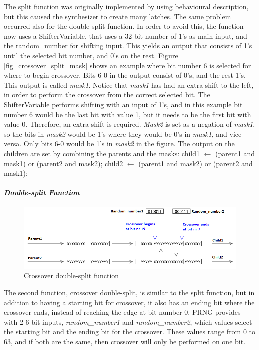 The split function was originally implemented by using behavioural description, but this caused the synthesizer to create many latches.
The same problem occurred also for the double-split function.
In order to avoid this, the function now uses a ShifterVariable, that uses a 32-bit number of 1's as main input, and the random\_number for shifting input.
This yields an output that consists of 1's until the selected bit number, and 0's on the rest.
Figure \ref{fig_crossover_split_mask} shows an example where bit number 6 is selected for where to begin crossover. 
Bits 6-0 in the output consist of 0's, and the rest 1's.
This output is called \emph{mask1}. Notice that \emph{mask1} has had an extra shift to the left, in order to perform the crossover from the correct selected bit. 
The ShifterVariable performs shifting with an input of 1's, and in this example bit number 6 would be the last bit with value 1, but it needs to be the first bit with value 0. Therefore, an extra shift is required.
\emph{Mask2} is set as a negation of \emph{mask1}, so the bits in \emph{mask2} would be 1's where they would be 0's in \emph{mask1}, and vice versa.
Only bits 6-0 would be 1's in \emph{mask2} in the figure.
The output on the children are set by combining the parents and the masks:
\linebreak
\linebreak child1 $\leftarrow$ (parent1 and mask1) or (parent2 and mask2);
\linebreak child2 $\leftarrow$ (parent1 and mask2) or (parent2 and mask1);

\paragraph{\textit{Double-split Function}}
\begin{figure}[H]
\includegraphics[width=\textwidth]{fpga/fig/crossover_doublesplit.png}
\caption{Crossover double-split function}
\label{fig_crossover_doublesplit}
\end{figure}

The second function, crossover double-split, is similar to the split function, but in addition to having a starting bit for crossover, it also has an ending bit where the crossover ends, instead of reaching the edge at bit number 0.
PRNG provides with 2 6-bit inputs, \emph{random\_number1} and \emph{random\_number2}, which values select the starting bit and the ending bit for the crossover.
These values range from 0 to 63, and if both are the same, then crossover will only be performed on one bit.

